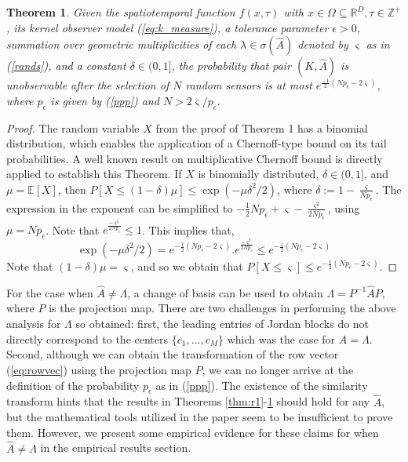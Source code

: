 \documentclass[letterpaper,12pt,peerreviewca,draftcls]{IEEEtran}
\newtheorem{theorem}{Theorem}%
\newcommand{\e}{\epsilon}
\newcommand{\empK}{\ensuremath{K}}
\newcommand{\dom}{\Omega}
\newcommand{\nsamp}{N}
\newcommand{\ncent}{M}
\renewcommand{\eqref}[1]{(\ref{eq:#1})}
\newcommand{\dimI}{\ensuremath{D}}
\newcommand{\JorLa}{\Lambda}
\newcommand{\dualop}{A}
\newcommand{\dualopApprox}{\widehat{\dualop}}
\newcommand{\tindex}{\tau}
\newcommand{\rands}{\varsigma}
\newcommand{\meanDist}{\mu}
\begin{document}
\begin{theorem}\label{thm:r2}
	Given the spatiotemporal function $ f(x,\tindex) $ with $ x \in \dom \subseteq  \mathbb{R}^\dimI, \tindex\in \mathbb{Z}^+  $, its kernel observer model \eqref{k_measure}, a tolerance parameter $\e>0$, summation over geometric multiplicities of each $ \lambda \in \sigma(\dualopApprox) $ denoted by $ \rands  $ as in  (\ref{rands}), and a constant $ \delta \in (0,1] $, the probability that pair $ (\empK, \dualopApprox) $ is unobservable after the selection of $ \nsamp $ random sensors is at most $ e^{\frac{-1}{2}(\nsamp p_{\e}-2\rands)} $, where $ p_{\e} $ is given by (\ref{ppp}) and $ \nsamp > 2\rands/p_{\e} $.
\end{theorem}
\begin{proof}
	The random variable $ X $ from the proof of Theorem 1 has a binomial distribution, which enables the application of a Chernoff-type bound on its tail probabilities. A well known result  on multiplicative Chernoff bound \cite{motwani2010randomized} is directly applied to establish this Theorem. If $ X $ is binomially distributed, $ \delta \in (0,1] $, and $ \meanDist = \mathbb{E}[X] $, then $ P[X\leq(1-\delta)\meanDist] \leq \exp(-\meanDist \delta^2/2) $, where $ \delta := 1-\frac{\rands}{\nsamp p_{\e}}$.  The expression in the exponent can be simplified to $ -\frac{1}{2}\nsamp p_{\e}+\rands - \frac{\rands^2}{2\nsamp p_{\e}} $, using $ \meanDist = \nsamp p_{\e} $. Note that $ e^{\frac{-\rands^2}{2\nsamp p_{\e}}} \leq 1$. This implies that,
	\begin{equation*}
	\exp(-\meanDist \delta^2/2) =  e^{-\frac{1}{2}(\nsamp p_{\e}-2\rands)}.e^{\frac{-\rands^2}{2\nsamp p_{\e}}}\leq e^{-\frac{1}{2}(\nsamp p_{\e}-2\rands)}
	\end{equation*}
	Note that $ (1-\delta)\mu = \rands $, and so we obtain that $ P[X\leq\rands] \leq e^{-\frac{1}{2}(\nsamp p_{\e}-2\rands)}. $
\end{proof}


For the case when $ \dualopApprox \neq \JorLa $, a change of basis can be used to obtain $ \JorLa = P^{-1}\dualopApprox P $, where $ P $ is the projection map. There are two challenges in performing the above analysis for $\JorLa$ so obtained: first, the leading entries of Jordan blocks do not directly correspond to the centers $\{ c_1,\dots,c_\ncent\}$ which was the case for $ \dualopApprox = \JorLa $. Second, although we can obtain the transformation of the row vector (\ref{eq:rowvec}) using the projection map $P$, we can no longer arrive at the definition of the probability $p_{\e}$ as in  (\ref{ppp}). The existence of the similarity transform hints that the results in Theorems \ref{thm:r1}-\ref{thm:r2} should hold for any $ \dualopApprox$, but the mathematical tools utilized in the paper seem to be insufficient to prove them. However, we present some empirical evidence for these claims for when $ \dualopApprox \neq \JorLa $  in the empirical results section.%
\end{document}
